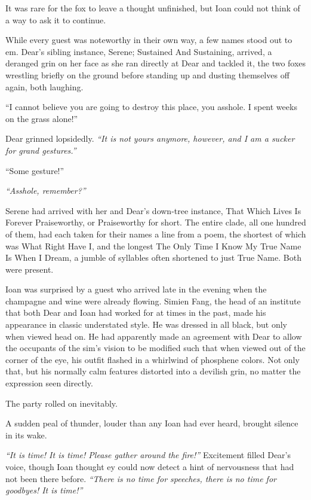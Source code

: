 It was rare for the fox to leave a thought unfinished, but Ioan could not think of a way to ask it to continue.

While every guest was noteworthy in their own way, a few names stood out to em. Dear's sibling instance, Serene; Sustained And Sustaining, arrived, a deranged grin on her face as she ran directly at Dear and tackled it, the two foxes wrestling briefly on the ground before standing up and dusting themselves off again, both laughing.

``I cannot believe you are going to destroy this place, you asshole. I spent weeks on the grass alone!''

Dear grinned lopsidedly. \emph{``It is not yours anymore, however, and I am a sucker for grand gestures.''}

``Some gesture!''

\emph{``Asshole, remember?''}

Serene had arrived with her and Dear's down-tree instance, That Which Lives Is Forever Praiseworthy, or Praiseworthy for short. The entire clade, all one hundred of them, had each taken for their names a line from a poem, the shortest of which was What Right Have I, and the longest The Only Time I Know My True Name Is When I Dream, a jumble of syllables often shortened to just True Name. Both were present.

Ioan was surprised by a guest who arrived late in the evening when the champagne and wine were already flowing. Simien Fang, the head of an institute that both Dear and Ioan had worked for at times in the past, made his appearance in classic understated style. He was dressed in all black, but only when viewed head on. He had apparently made an agreement with Dear to allow the occupants of the sim's vision to be modified such that when viewed out of the corner of the eye, his outfit flashed in a whirlwind of phosphene colors. Not only that, but his normally calm features distorted into a devilish grin, no matter the expression seen directly.

The party rolled on inevitably.

A sudden peal of thunder, louder than any Ioan had ever heard, brought silence in its wake.

\emph{``It is time! It is time! Please gather around the fire!''} Excitement filled Dear's voice, though Ioan thought ey could now detect a hint of nervousness that had not been there before. \emph{``There is no time for speeches, there is no time for goodbyes! It is time!''}

